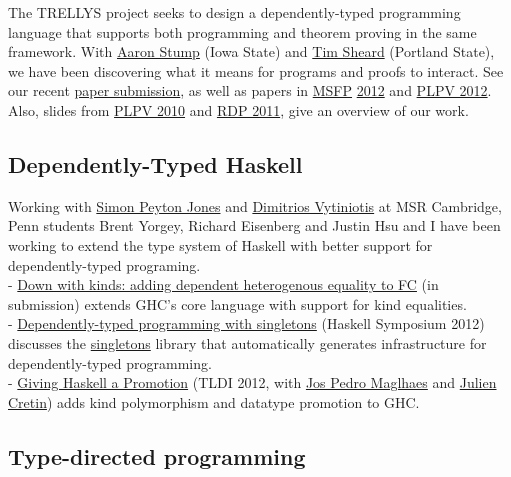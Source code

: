 \documentclass[]{article}
\begin{document}
The TRELLYS project seeks to design a dependently-typed programming
language that supports both programming and theorem proving in the same
framework. With \href{http://homepage.cs.uiowa.edu/\%7Eastump/}{Aaron
Stump} (Iowa State) and \href{http://web.cecs.pdx.edu/\%7Esheard/}{Tim
Sheard} (Portland State), we have been discovering what it means for
programs and proofs to interact. See our recent
\href{papers/modal.pdf}{paper submission}, as well as papers in
\href{http://www.seas.upenn.edu/\%7Esweirich/papers/msfp12log.pdf}{MSFP}
\href{http://www.seas.upenn.edu/\%7Esweirich/papers/msfp12prog.pdf}{2012}
and
\href{http://www.seas.upenn.edu/\%7Esweirich/papers/plpv2012genreccbv.pdf}{PLPV
2012}. Also, slides from \href{talks/TrellysPLPV.pdf}{PLPV 2010} and
\href{talks/tlca-2011.pdf}{RDP 2011}, give an overview of our work.

\subsection{Dependently-Typed Haskell}

Working with
\href{http://research.microsoft.com/en-us/people/simonpj/}{Simon Peyton
Jones} and
\href{http://research.microsoft.com/en-us/people/dimitris/}{Dimitrios
Vytiniotis} at MSR Cambridge, Penn students Brent Yorgey, Richard
Eisenberg and Justin Hsu and I have been working to extend the type
system of Haskell with better support for dependently-typed programing.
\\ - \href{papers/nokinds-extended.pdf}{Down with kinds: adding
dependent heterogenous equality to FC} (in submission) extends GHC's
core language with support for kind equalities.\\-
\href{http://www.cis.upenn.edu/\%7Eeir/papers/2012/singletons/paper.pdf}{Dependently-typed
programming with singletons} (Haskell Symposium 2012) discusses the
\href{http://hackage.haskell.org/package/singletons}{singletons} library
that automatically generates infrastructure for dependently-typed
programming.\\- \href{papers/tldi12.pdf}{Giving Haskell a Promotion}
(TLDI 2012, with \href{http://dreixel.net/}{Jos Pedro Maglhaes} and
\href{http://gallium.inria.fr/\%7Ejcretin/}{Julien Cretin}) adds kind
polymorphism and datatype promotion to GHC.

\subsection{Type-directed programming}
\end{document}
